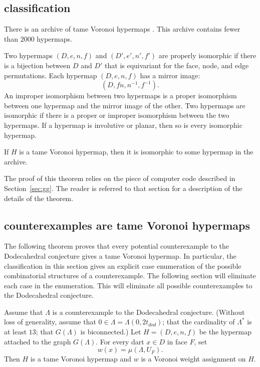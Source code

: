 \subsection{classification}\label{sec:class}

There is an archive of tame Voronoi hypermaps \cite{code}.  This
archive contains fewer than $2000$ hypermaps.  

Two hypermaps $(D,e,n,f)$ and $(D',e',n',f')$ are properly isomorphic if there
is a bijection between $D$ and $D'$ that is equivariant for the face, node, and
edge permutations.  Each hypermap $(D,e,n,f)$ has a mirror image:
  $$
  (D,f n, n^{-1},f^{-1}).
  $$
  An improper
isomorphism between two hypermaps is a proper isomorphism between one hypermap and the
mirror image of the other.
Two hypermaps are isomorphic if there is a proper or improper isomorphism between
the two hypermaps. If a hypermap is involutive or planar, then so is every isomorphic
hypermap.

\begin{theorem}  If $H$ is a tame Voronoi hypermap, then it is isomorphic to
some hypermap in the archive.
\end{theorem}

The proof of this theorem relies on the piece of 
computer code described in Section~\ref{sec:gg}.  The reader is referred to that section
for a description of the details of the theorem.

\subsection{counterexamples are tame Voronoi hypermaps}

The following theorem proves that every potential counterexample to the Dodecahedral
conjecture gives a tame Voronoi hypermap.  In particular, the classification
in this section gives an explicit case enumeration of the possible combinatorial structures
of a counterexample.  The following section will eliminate each case in the enumeration.
This will eliminate all possible counterexamples to the Dodecahedral conjecture.

\begin{theorem}  Assume that $\Lambda$ is a counterexample to the Dodecahedral
conjecture.  (Without loss of generality,  assume that $0\in\Lambda=\Lambda(0,2t_{dod})$;
that the cardinality of $\Lambda^*$ is at least $13$; that $G(\Lambda)$ is biconnected.)  Let $H=(D,e,n,f)$ be the hypermap attached to the graph $G(\Lambda)$.
 For every dart $x\in D$ in face $F$, set
$$w(x) = \mu(\Lambda,U_F).$$
Then $H$ is a tame Voronoi hypermap and $w$ is a Voronoi weight assignment on $H$.
\end{theorem}



